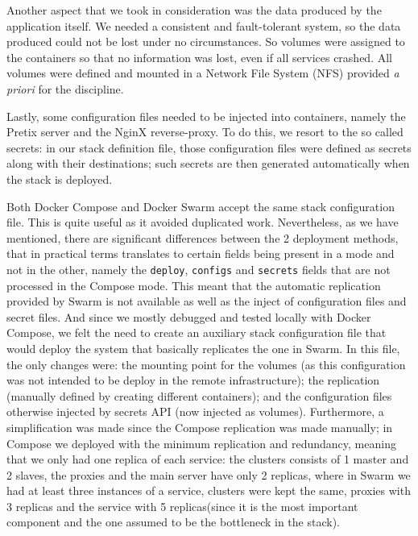 \documentclass[12pt]{article}
\begin{document}
Another aspect that we took in consideration was the data produced by the application itself. 
We needed a consistent and fault-tolerant system, so the data produced could not be lost under no circumstances. 
So volumes were assigned to the containers so that no information was lost, even if all services crashed.
All volumes were defined and mounted in a Network File System (NFS) provided \textit{a priori} for the discipline.

Lastly, some configuration files needed to be injected into containers, namely the Pretix server and the NginX reverse-proxy. 
To do this, we resort to the so called secrets: in our stack definition file, those configuration files were defined as secrets along with their destinations; 
such secrets are then generated automatically when the stack is deployed. 

Both Docker Compose and Docker Swarm accept the same stack configuration file. 
This is quite useful as it avoided duplicated work.
Nevertheless, as we have mentioned, there are significant differences between the 2 deployment methods, that in practical terms translates to certain fields 
being present in a mode and not in the other, namely the \texttt{deploy}, \texttt{configs} and \texttt{secrets} fields that are not processed in the Compose mode.
This meant that the automatic replication provided by Swarm is not available as well as the inject of configuration files and secret files. 
And since we mostly debugged and tested locally with Docker Compose, we felt the need to create an auxiliary stack configuration file that would deploy the 
system that basically replicates the one in Swarm. 
In this file, the only changes were: the mounting point for the volumes (as this configuration was not intended to be deploy in the remote infrastructure); the 
replication (manually defined by creating different containers); and the configuration files otherwise injected by secrets API (now injected as volumes). Furthermore, a simplification was made since the Compose replication was made manually; in Compose we deployed with the minimum replication and redundancy, meaning that we only had one replica of each service: the clusters consists of 1 master and 2 slaves, the proxies and the main server have only 2 replicas, where in Swarm we had at least three instances of a service, clusters were kept the same, proxies with 3 replicas and the service with 5 replicas(since it is the most important component and the one assumed to be the bottleneck in the stack).
\end{document}
